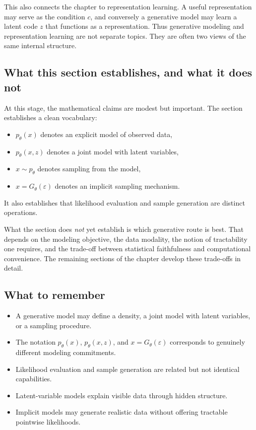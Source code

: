 \medskip

\noindent
This also connects the chapter to representation learning.
A useful representation may serve as the condition $c$, and conversely a generative model may learn a latent code $z$ that functions as a representation.
Thus generative modeling and representation learning are not separate topics.
They are often two views of the same internal structure.

\subsection*{What this section establishes, and what it does not}

At this stage, the mathematical claims are modest but important.
The section establishes a clean vocabulary:
\begin{itemize}
    \item $p_\theta(x)$ denotes an explicit model of observed data,
    \item $p_\theta(x,z)$ denotes a joint model with latent variables,
    \item $x\sim p_\theta$ denotes sampling from the model,
    \item $x = G_\theta(\varepsilon)$ denotes an implicit sampling mechanism.
\end{itemize}
It also establishes that likelihood evaluation and sample generation are distinct operations.

\medskip

\noindent
What the section does \emph{not} yet establish is which generative route is best.
That depends on the modeling objective, the data modality, the notion of tractability one requires, and the trade-off between statistical faithfulness and computational convenience.
The remaining sections of the chapter develop these trade-offs in detail.

\subsection*{What to remember}

\begin{itemize}
    \item A generative model may define a density, a joint model with latent variables, or a sampling procedure.
    \item The notation $p_\theta(x)$, $p_\theta(x,z)$, and $x=G_\theta(\varepsilon)$ corresponds to genuinely different modeling commitments.
    \item Likelihood evaluation and sample generation are related but not identical capabilities.
    \item Latent-variable models explain visible data through hidden structure.
    \item Implicit models may generate realistic data without offering tractable pointwise likelihoods.
\end{itemize}

